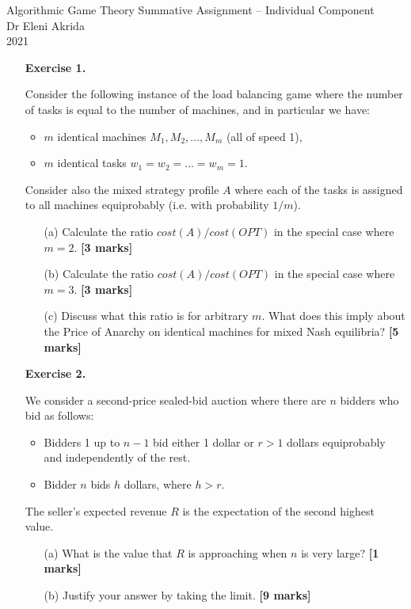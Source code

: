 \documentclass{article}
\begin{document}
\begin{center}
	\LARGE{Algorithmic Game Theory Summative Assignment -- Individual Component}\\[0.1cm]
	\Large{Dr Eleni Akrida}\\[0.1cm]
	2021\\[0.5cm]
\end{center}





\begin{enumerate}

	\item[\textbf{Exercise 1.}]   %

	      Consider the following instance of the load balancing game where the number of tasks is equal to the number of machines, and in particular we have:
	      \begin{itemize}
		      \item $m$ identical machines $M_1, M_2, \dots, M_m$ (all of speed 1),
		      \item $m$ identical tasks $w_1 = w_2 = \dots = w_m = 1$.
	      \end{itemize}
	      Consider also the mixed strategy profile $A$ where each of the tasks is assigned to all machines equiprobably (i.e. with probability $1/m$).
	      \begin{enumerate}
		      \item[(a)] Calculate the ratio $cost(A)/cost(OPT)$ in the special case where $m=2$.  \hfill{\bf [3 marks]}\smallskip
		      \item[(b)] Calculate the ratio $cost(A)/cost(OPT)$ in the special case where $m=3$.  \hfill{\bf [3 marks]}\smallskip
		      \item[(c)] Discuss what this ratio is for arbitrary $m$. What does this imply about the Price of Anarchy on identical machines for mixed Nash equilibria?  \hfill{\bf [5 marks]}\smallskip
	      \end{enumerate}
	      \vspace*{0.8cm}


	\item[\textbf{Exercise 2.}]  %

	      We consider a second-price sealed-bid auction where there are $n$ bidders who bid as follows:
	      \begin{itemize}
		      \item Bidders 1 up to $n-1$ bid either 1 dollar or $r > 1$ dollars equiprobably and
		            independently of the rest.
		      \item Bidder $n$ bids $h$ dollars, where $h > r$.
	      \end{itemize}
	      The seller's expected revenue $R$ is the expectation of the second highest value.
	      \begin{itemize}
		      \item[(a)] What is the value that $R$ is approaching when $n$ is very large? \hfill{\bf [1 marks]}\smallskip
		      \item[(b)] Justify your answer by taking the limit. \hfill{\bf [9 marks]}\smallskip
	      \end{itemize}


\end{enumerate}
\end{document}
